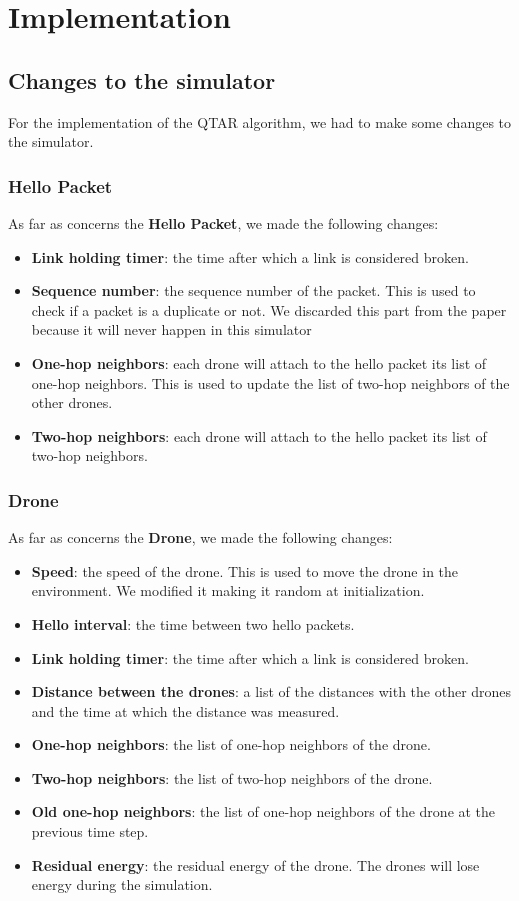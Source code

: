 \section{Implementation}

\subsection{Changes to the simulator}
For the implementation of the QTAR algorithm, we had to make some changes to the simulator.

\subsubsection{Hello Packet}
As far as concerns the \textbf{Hello Packet}, we made the following changes:
\begin{itemize}
    \item \textbf{Link holding timer}: the time after which a link is considered broken.
    \item \textbf{Sequence number}: the sequence number of the packet. This is used to check if a packet is a duplicate or not. We discarded this part from the paper because it will never happen in this simulator
    \item \textbf{One-hop neighbors}: each drone will attach to the hello packet its list of one-hop neighbors. This is used to update the list of two-hop neighbors of the other drones.
    \item \textbf{Two-hop neighbors}: each drone will attach to the hello packet its list of two-hop neighbors.
\end{itemize}


\subsubsection{Drone}
As far as concerns the \textbf{Drone}, we made the following changes:
\begin{itemize}
    \item \textbf{Speed}: the speed of the drone. This is used to move the drone in the environment. We modified it making it random at initialization.
    \item \textbf{Hello interval}: the time between two hello packets.
    \item \textbf{Link holding timer}: the time after which a link is considered broken.
    \item \textbf{Distance between the drones}: a list of the distances with the other drones and the time at which the distance was measured.
    \item \textbf{One-hop neighbors}: the list of one-hop neighbors of the drone.
    \item \textbf{Two-hop neighbors}: the list of two-hop neighbors of the drone.
    \item \textbf{Old one-hop neighbors}: the list of one-hop neighbors of the drone at the previous time step.
    \item \textbf{Residual energy}: the residual energy of the drone. The drones will lose energy during the simulation.
\end{itemize}


